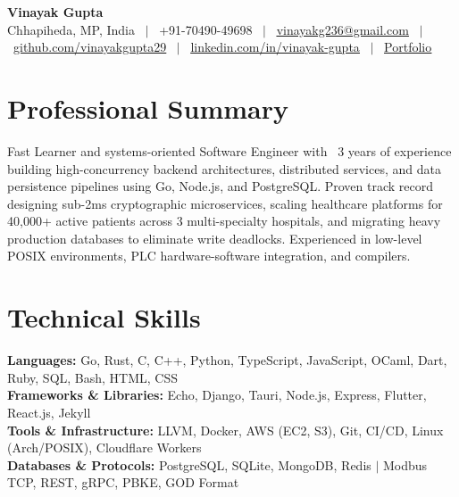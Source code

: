 \documentclass[10pt,a4paper]{article}
\begin{document}
\color{textdark}

\begin{center}
  {\Huge \textbf{\color{primary} Vinayak Gupta}} \\[4pt]
  \small
  Chhapiheda, MP, India \ $\vert$ \
  +91-70490-49698 \ $\vert$ \
  \href{mailto:vinayakg236@gmail.com}{\underline{vinayakg236@gmail.com}} \ $\vert$ \
  \href{https://github.com/vinayakgupta29}{\underline{github.com/vinayakgupta29}} \ $\vert$ \
  \href{https://linkedin.com/in/vinayak-gupta-70a808202}{\underline{linkedin.com/in/vinayak-gupta}} \ $\vert$ \
  \href{https://vinayakgupta29.github.io/portfolio}{\underline{Portfolio}}
\end{center}
\vspace{-4pt}

\section*{Professional Summary}
\vspace{1pt}
Fast Learner and systems-oriented Software Engineer with ~3 years of experience building high-concurrency backend architectures, distributed services, and data persistence pipelines using Go, Node.js, and PostgreSQL. Proven track record designing sub-2ms cryptographic microservices, scaling healthcare platforms for 40,000+ active patients across 3 multi-specialty hospitals, and migrating heavy production databases to eliminate write deadlocks. Experienced in low-level POSIX environments, PLC hardware-software integration, and compilers.


\section*{Technical Skills}
\vspace{1pt}
\textbf{Languages:} Go, Rust, C, C++, Python, TypeScript, JavaScript, OCaml, Dart, Ruby, SQL, Bash, HTML, CSS \\
\textbf{Frameworks \& Libraries:} Echo, Django, Tauri, Node.js, Express, Flutter, React.js, Jekyll \\
\textbf{Tools \& Infrastructure:} LLVM, Docker, AWS (EC2, S3), Git, CI/CD, Linux (Arch/POSIX), Cloudflare Workers \\
\textbf{Databases \& Protocols:} PostgreSQL, SQLite, MongoDB, Redis $\vert$ Modbus TCP, REST, gRPC, PBKE, GOD Format
\end{document}
